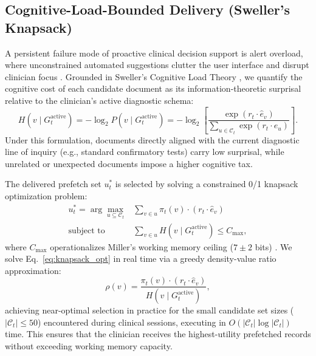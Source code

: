 \documentclass[10pt, onecolumn]{article}
\begin{document}
\subsection{Cognitive-Load-Bounded Delivery (Sweller's Knapsack)}
\label{sec:cogload_knapsack}

A persistent failure mode of proactive clinical decision support is alert overload, where unconstrained automated suggestions clutter the user interface and disrupt clinician focus \cite{goddard2012automation,lyell2017automation}. Grounded in Sweller's Cognitive Load Theory \cite{sweller1988cognitive,sweller2019cognitive}, we quantify the cognitive cost of each candidate document as its information-theoretic surprisal relative to the clinician's active diagnostic schema:
\begin{equation}
  H(v \mid G_t^{\text{active}}) = -\log_2 P(v \mid G_t^{\text{active}}) = -\log_2 \left[ \frac{\exp(r_t \cdot \hat{e}_v)}{\sum_{u \in \mathcal{C}_t} \exp(r_t \cdot \hat{e}_u)} \right].
  \label{eq:surprisal_cost}
\end{equation}
Under this formulation, documents directly aligned with the current diagnostic line of inquiry (e.g., standard confirmatory tests) carry low surprisal, while unrelated or unexpected documents impose a higher cognitive tax.

The delivered prefetch set $u_t^*$ is selected by solving a constrained 0/1 knapsack optimization problem:
\begin{equation}
  \begin{aligned}
    u_t^* = \arg\max_{u \subseteq \mathcal{C}_t} & \sum_{v \in u} \pi_t(v) \cdot (r_t \cdot \hat{e}_v) \\
    \text{subject to } & \sum_{v \in u} H(v \mid G_t^{\text{active}}) \le C_{\max},
  \end{aligned}
  \label{eq:knapsack_opt}
\end{equation}
where $C_{\max}$ operationalizes Miller's working memory ceiling ($7 \pm 2$ bits) \cite{miller1956magical}. We solve Eq.~\eqref{eq:knapsack_opt} in real time via a greedy density-value ratio approximation:
\begin{equation}
  \rho(v) = \frac{\pi_t(v) \cdot (r_t \cdot \hat{e}_v)}{H(v \mid G_t^{\text{active}})},
  \label{eq:greedy_ratio}
\end{equation}
achieving near-optimal selection in practice for the small candidate set sizes ($|\mathcal{C}_t| \le 50$) encountered during clinical sessions, executing in $O(|\mathcal{C}_t| \log |\mathcal{C}_t|)$ time. This ensures that the clinician receives the highest-utility prefetched records without exceeding working memory capacity.
\end{document}
